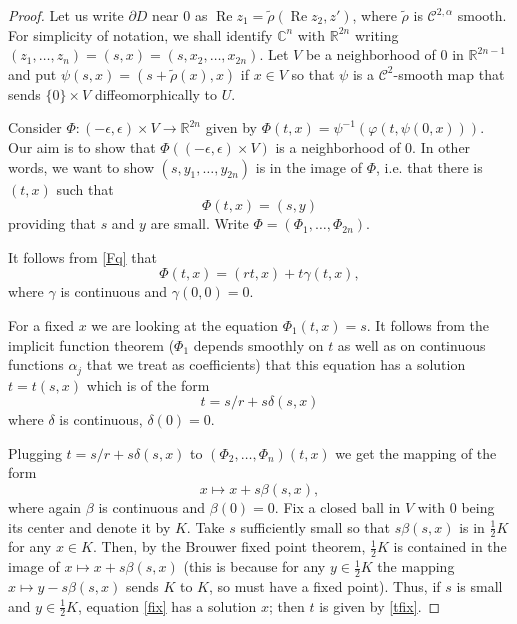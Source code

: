 \documentclass[a4paper,12pt]{amsart}
\def\re{\operatorname{Re}}
\theoremstyle{remark}\newtheorem{remark}[theorem]{Remark}
\begin{document}
\begin{proof}
Let us write $\partial D$ near $0$ as $\re z_1 =\tilde \rho(\re z_2, z')$, where $\tilde \rho$ is $\mathcal C^{2, \alpha}$ smooth. For  simplicity of  notation, we shall identify $\mathbb C^n$ with $\mathbb R^{2n}$ writing $(z_1,\ldots, z_n)= (s, x)=(s, x_2, \ldots, x_{2n})$. Let $V$ be a neighborhood of $0$ in $\mathbb R^{2n-1}$ and put $\psi(s,x) = (s + \tilde\rho(x),x)$ if $x\in V$ so that $\psi$ is a $\mathcal C^2$-smooth map that sends $\{0\}\times V$ diffeomorphically to $U$.

Consider $\Phi: (-\epsilon,\epsilon)\times V \to \mathbb R^{2n}$ given by $\Phi(t,x)=\psi^{-1}( \varphi (t, \psi(0,x))).$ Our aim is to show that $\Phi((-\epsilon,\epsilon)\times V)$ is a neighborhood of $0$. In other words, we want to show $(s,y_1,\ldots, y_{2n})$ is in the image of $\Phi$, i.e. that there is $(t,x)$ such that 
\begin{equation}\label{fix}\Phi(t,x)= (s,y)
\end{equation}
providing that $s$ and $y$ are small.
Write $\Phi=(\Phi_1, \ldots, \Phi_{2n})$. 

It follows from \eqref{Fq} that
$$\Phi(t,x) = (rt, x) + t \gamma(t,x),$$ where $\gamma$ is continuous and $\gamma(0,0)=0$.



For a fixed $x$ we are looking at the equation $\Phi_1(t,x) = s$. It follows from the implicit function theorem ($\Phi_1$ depends smoothly on $t$ as well as on continuous functions $\alpha_j$ that we treat as coefficients) that this equation has a solution $t=t(s,x)$ which is of the form 
\begin{equation}\label{tfix}t= s/r + s\delta(s,x)
\end{equation}where $\delta$ is continuous, $\delta(0)=0$.


Plugging $t=s/r + s\delta(s,x)$ to $(\Phi_2, \ldots, \Phi_n)(t,x)$ we get the mapping of the form $$ x\mapsto x + s \beta(s,x),$$ where again $\beta$ is continuous and $\beta(0)=0$. Fix a closed ball in $V$ with $0$ being its center and denote it by $K$. Take $s$ sufficiently small so that $s \beta(s,x)$ is in $\frac12 K$ for any $x\in K$. Then, by the Brouwer fixed point theorem, $\frac12 K$ is contained in the image of $x\mapsto x + s \beta(s,x)$ (this is because for any $y\in \frac12 K$ the mapping $x\mapsto y- s\beta(s,x)$ sends $K$ to $K$, so must have a fixed point). Thus, if $s$ is small and $y\in \frac12 K$, equation \eqref{fix} has a solution $x$; then $t$ is given by \eqref{tfix}.


\end{proof}
\end{document}
